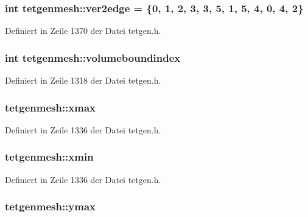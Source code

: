 \hypertarget{classtetgenmesh_ad70ef1b418a713939d2c2470de436afb}{
\subsubsection[{ver2edge}]{\setlength{\rightskip}{0pt plus 5cm}int tetgenmesh\-::ver2edge = \{0, 1, 2, 3, 3, 5, 1, 5, 4, 0, 4, 2\}\hspace{0.3cm}{\ttfamily [static]}}}\label{classtetgenmesh_ad70ef1b418a713939d2c2470de436afb}


Definiert in Zeile 1370 der Datei tetgen.\-h.

\hypertarget{classtetgenmesh_afbc49fd2c3c19c8725ea89348440e58b}{
\subsubsection[{volumeboundindex}]{\setlength{\rightskip}{0pt plus 5cm}int tetgenmesh\-::volumeboundindex}}\label{classtetgenmesh_afbc49fd2c3c19c8725ea89348440e58b}


Definiert in Zeile 1318 der Datei tetgen.\-h.

\hypertarget{classtetgenmesh_a06854628ed8614900136cae74d96925c}{
\subsubsection[{xmax}]{ tetgenmesh\-::xmax}}\label{classtetgenmesh_a06854628ed8614900136cae74d96925c}


Definiert in Zeile 1336 der Datei tetgen.\-h.

\hypertarget{classtetgenmesh_a560fe4942b4bab62881403f096532bda}{
\subsubsection[{xmin}]{ tetgenmesh\-::xmin}}\label{classtetgenmesh_a560fe4942b4bab62881403f096532bda}


Definiert in Zeile 1336 der Datei tetgen.\-h.

\hypertarget{classtetgenmesh_ac836c44e07bdd85bb4402287a22dc641}{
\subsubsection[{ymax}]{ tetgenmesh\-::ymax}}\label{classtetgenmesh_ac836c44e07bdd85bb4402287a22dc641}


